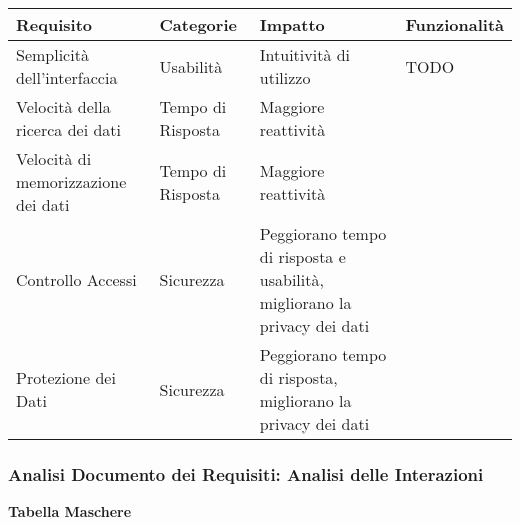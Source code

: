 \begin{tabular} {|P{4cm}|P{2.5cm}|P{3.5cm}|P{5.5cm}|}
    \hline
    \textbf{Requisito}                  & \textbf{Categorie} & \textbf{Impatto}                                                         & \textbf{Funzionalità} \\
    \hline
    Semplicità dell'interfaccia         & Usabilità          & Intuitività di utilizzo                                                  & TODO                  \\
    \hline
    Velocità della ricerca dei dati     & Tempo di Risposta  & Maggiore reattività                                                      &                       \\
    \hline
    Velocità di memorizzazione dei dati & Tempo di Risposta  & Maggiore reattività                                                      &                       \\
    \hline
    Controllo Accessi                   & Sicurezza          & Peggiorano tempo di risposta e usabilità, migliorano la privacy dei dati &                       \\
    \hline
    Protezione dei Dati                 & Sicurezza          & Peggiorano tempo di risposta, migliorano la privacy dei dati             &                       \\
    \hline
\end{tabular}

\newpage

\subsubsection{Analisi Documento dei Requisiti: Analisi delle Interazioni}
\hfill \break

\textbf{Tabella Maschere}
\hfill \break

